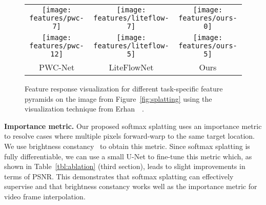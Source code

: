\documentclass[10pt,twocolumn,letterpaper]{article}
\newlength{\itemwidth}
\begin{document}
\begin{figure}\centering
    \setlength{\tabcolsep}{0.06cm}
    \setlength{\itemwidth}{2.7cm}
    \hspace*{-\tabcolsep}\begin{tabular}{ccc}
            \texttt{[image: features/pwc-7]}
        &
            \texttt{[image: features/liteflow-7]}
        &
            \texttt{[image: features/ours-0]}
        \vspace{-0.0cm} \\
            \texttt{[image: features/pwc-12]}
        &
            \texttt{[image: features/liteflow-5]}
        &
            \texttt{[image: features/ours-5]}
        \vspace{-0.0cm} \\
            \footnotesize PWC-Net
        &
            \footnotesize LiteFlowNet
        &
            \footnotesize Ours
        \\
    \end{tabular}\vspace{-0.2cm}
	\caption{Feature response visualization for different task-specific feature pyramids on the image from Figure~\ref{fig:splatting} using the visualization technique from Erhan~\etal~\cite{Erhan_OTHER_2009}.}\vspace{-0.3cm}
	\label{fig:features}
\end{figure}

\vspace{0.05in}
\noindent\textbf{Importance metric.} Our proposed softmax splatting uses an importance metric  to resolve cases where multiple pixels forward-warp to the same target location. We use brightness constancy~\cite{Baker_IJCV_2011} to obtain this metric. Since softmax splatting is fully differentiable, we can use a small U-Net to fine-tune this metric which, as shown in Table~\ref{tbl:ablation} (third section), leads to slight improvements in terms of PSNR. This demonstrates that softmax splatting can effectively supervise  and that brightness constancy works well as the importance metric for video frame interpolation.
\end{document}
